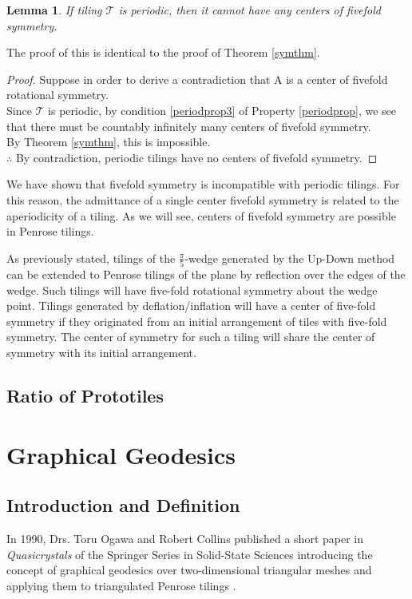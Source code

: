 \documentclass[
  oneside,
  11pt, a4paper,
  footinclude=true,
  headinclude=true,
  cleardoublepage=empty
]{scrbook}
\newtheorem{mylem}{Lemma}
\begin{document}
\begin{mylem}
If tiling $\mathcal{T}$ is periodic, then it cannot have any centers of fivefold symmetry.
\end{mylem}
The proof of this is identical to the proof of Theorem \ref{symthm}.
\begin{proof}
Suppose in order to derive a contradiction that A is a center of fivefold rotational symmetry.\\
Since $\mathcal{T}$ is periodic, by condition \ref{periodprop3} of Property \ref{periodprop}, we see that there must be countably infinitely many centers of fivefold symmetry.\\
By Theorem \ref{symthm}, this is impossible.\\
$\therefore$ By contradiction, periodic tilings have no centers of fivefold symmetry.
\end{proof}

We have shown that fivefold symmetry is incompatible with periodic tilings. For this reason, the admittance of a single center fivefold symmetry is related to the aperiodicity of a tiling. As we will see, centers of fivefold symmetry are possible in Penrose tilings. 

As previously stated, tilings of the $\frac{\pi}{5}$-wedge generated by the Up-Down method can be extended to Penrose tilings of the plane by reflection over the edges of the wedge. Such tilings will have five-fold rotational symmetry about the wedge point. Tilings generated by deflation/inflation will have a center of five-fold symmetry if they originated from an initial arrangement of tiles with five-fold symmetry. The center of symmetry for such a tiling will share the center of symmetry with its initial arrangement.  





\section{Ratio of Prototiles}
\chapter{Graphical Geodesics}
\section{Introduction and Definition}
In 1990, Drs. Toru Ogawa and Robert Collins published a short paper in \textit{Quasicrystals} of the Springer Series in Solid-State Sciences introducing the concept of graphical geodesics over two-dimensional triangular meshes and applying them to triangulated Penrose tilings \cite{Ogawa1999}. 
\end{document}
